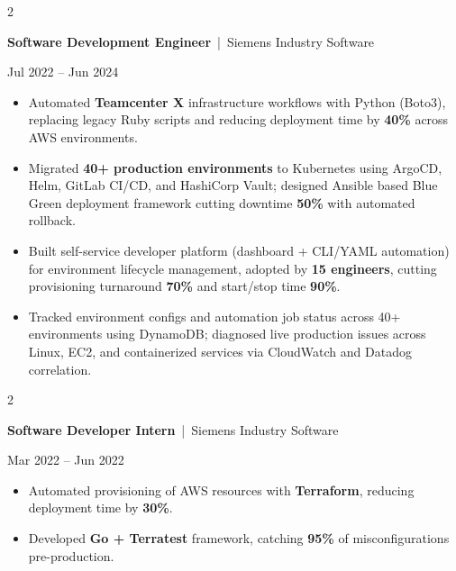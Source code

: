 \documentclass[10pt, letterpaper]{article}
\newenvironment{highlights}{
    \begin{itemize}[
        topsep=0.10 cm,
        parsep=0.06 cm,
        partopsep=0pt,
        itemsep=0.06 cm,
        leftmargin=12pt
    ]
}{
    \end{itemize}
}
\newenvironment{twocolentry}[2][]{
    \onecolentry
    \def\secondColumn{#2}
    \setcolumnwidth{\fill, 4.5 cm}
    \begin{paracol}{2}
}{
    \switchcolumn \raggedleft \secondColumn
    \end{paracol}
    \endonecolentry
}
\begin{document}
\vspace{0.15 cm}

\begin{twocolentry}{Jul 2022 -- Jun 2024}
\textbf{Software Development Engineer} \,|\, Siemens Industry Software
\end{twocolentry}
\begin{highlights}
  \item Automated \textbf{Teamcenter X} infrastructure workflows with Python (Boto3), replacing legacy Ruby scripts and reducing deployment time by \textbf{40\%} across AWS environments.
  \item Migrated \textbf{40+ production environments} to Kubernetes using ArgoCD, Helm, GitLab CI/CD, and HashiCorp Vault; designed Ansible based Blue Green deployment framework cutting downtime \textbf{50\%} with automated rollback.
  \item Built self-service developer platform (dashboard + CLI/YAML automation) for environment lifecycle management, adopted by \textbf{15 engineers}, cutting provisioning turnaround \textbf{70\%} and start/stop time \textbf{90\%}.
  \item Tracked environment configs and automation job status across 40+ environments using DynamoDB; diagnosed live production issues across Linux, EC2, and containerized services via CloudWatch and Datadog correlation.
\end{highlights}

\vspace{0.15 cm}

\begin{twocolentry}{Mar 2022 -- Jun 2022}
\textbf{Software Developer Intern} \,|\, Siemens Industry Software
\end{twocolentry}
\begin{highlights}
  \item Automated provisioning of AWS resources with \textbf{Terraform}, reducing deployment time by \textbf{30\%}.
  \item Developed \textbf{Go + Terratest} framework, catching \textbf{95\%} of misconfigurations pre-production.
\end{highlights}

\end{document}
